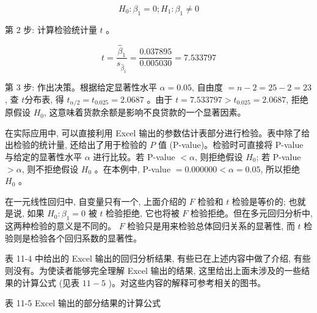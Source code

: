 \documentclass[10pt]{article}
\begin{document}
\begin{CJK*}{UTF8}{bsmi}
$$
H_{0}: \beta_{1}=0 ; H_{1}: \beta_{1} \neq 0
$$

第 2 步: 计算检验统计量 $t$ 。

$$
t=\frac{\hat{\beta}_{1}}{s_{\hat{\beta}_{1}}}=\frac{0.037895}{0.005030}=7.533797
$$

第 3 步: 作出决策。根据给定显著性水平 $\alpha=0.05$, 自由度 $=n-2=25-2=23$, 查 $t$分布表, 得 $t_{\alpha / 2}=t_{0.025}=2.0687$ 。由于 $t=7.533797>t_{0.025}=2.0687$, 拒绝原假设 $H_{0}$, 这意味着货款余额是影响不良贷款的一个显著因素。

在实际应用中, 可以直接利用 Excel 输出的参数估计表部分进行检验。表中除了给出检验的统计量, 还给出了用于检验的 $P$ 值 (P-value)。检验时可直接将 P-value 与给定的显著性水平 $\alpha$ 进行比较。若 $\mathrm{P}$-value $<\alpha$, 则拒绝假设 $H_{0}$; 若 $\mathrm{P}$-value $>\alpha$, 则不拒绝假设 $H_{0}$ 。在本例中, $\mathrm{P}$-value $=0.000000<\alpha=0.05$, 所以拒绝 $H_{0}$ 。

在一元线性回归中, 自变量只有一个, 上面介绍的 $F$ 检验和 $t$ 检验是等价的; 也就是说, 如果 $H_{0}: \beta_{1}=0$ 被 $t$ 检验拒绝, 它也将被 $F$ 检验拒绝。但在多元回归分析中, 这两种检验的意义是不同的。 $F$ 检验只是用来检验总体回归关系的显著性, 而 $t$ 检验则是检验各个回归系数的显著性。

表 11-4 中给出的 Excel 输出的回归分析结果, 有些已在上述内容中做了介绍, 有些则没有。为使读者能够完全理解 Excel 输出的结果, 这里给出上面未涉及的一些结果的计算公式 (见表 $11-5$ )。对这些内容的解释可参考相关的图书。

表 11-5 Excel 输出的部分结果的计算公式


\end{CJK*}
\end{document}
